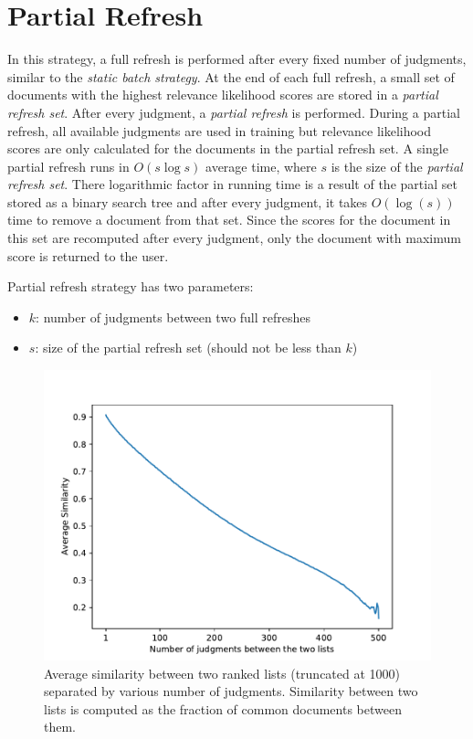 \section{Partial Refresh}
\label{sec:partial}

In this strategy, a full refresh is performed after every fixed number of
judgments, similar to the \textit{static batch strategy}. At the end of each
full refresh, a small set of documents with the highest relevance likelihood
scores are stored in a \textit{partial refresh set}. After every judgment, a
\textit{partial refresh} is performed. During a partial refresh, all available
judgments are used in training but relevance likelihood scores are only
calculated for the documents in the partial refresh set. A single partial
refresh runs in $O(s\log{s})$ average time, where $s$ is the size of the
\textit{partial refresh set}. There logarithmic factor in running time
is a result of the partial set stored as a binary search tree and after every
judgment, it takes $O(\log(s))$ time to remove a document from that set. Since
the scores for the document in this set are recomputed after every
judgment, only the document with maximum score is returned to the user.

Partial refresh strategy has two parameters:
\begin{itemize}
    \item $k$: number of judgments between two full refreshes
    \item $s$: size of the partial refresh set (should not be less than $k$)
\end{itemize}

\begin{figure}[]
\includegraphics[width=\textwidth]{plots/ranklist_similarity.pdf}
\caption{Average similarity between two ranked lists (truncated at 1000)
separated by various number of judgments. Similarity between two lists is
computed as the fraction of common documents between them.}
\label{plot:partial}
\end{figure}

